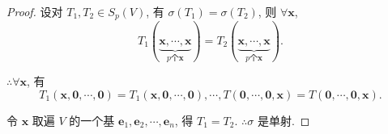 \documentclass[color=black,device=normal,lang=cn,mode=geye]{elegantnote}
\begin{document}
\begin{proof}
    设对 $T_1,T_2\in S_p(V)$, 有 $\sigma(T_1)=\sigma(T_2)$, 则 $\forall\boldsymbol{x}$,
    \[T_1(\underbrace{\boldsymbol{x},\cdots,\boldsymbol{x}}_{p\text{个}\boldsymbol{x}})=T_2(\underbrace{\boldsymbol{x},\cdots,\boldsymbol{x}}_{p\text{个}\boldsymbol{x}}).\]

    $\therefore\forall\boldsymbol{x}$, 有
    \[T_1(\boldsymbol{x},\boldsymbol{0},\cdots,\boldsymbol{0})=T_1(\boldsymbol{x},\boldsymbol{0},\cdots,\boldsymbol{0}),\cdots,T(\boldsymbol{0},\cdots,\boldsymbol{0},\boldsymbol{x})=T(\boldsymbol{0},\cdots,\boldsymbol{0},\boldsymbol{x}).\]
    
    令 $\boldsymbol{x}$ 取遍 $V$ 的一个基 $\boldsymbol{e}_1,\boldsymbol{e}_2,\cdots,\boldsymbol{e}_n$, 得 $T_1=T_2$. $\therefore\sigma$ 是单射.
\end{proof}
\end{document}
